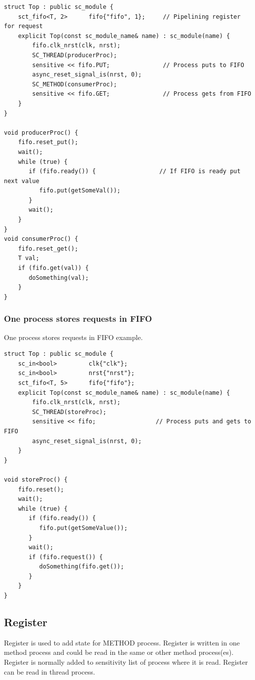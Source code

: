 \begin{lstlisting}[style=mycpp]
struct Top : public sc_module {
    sct_fifo<T, 2>      fifo{"fifo", 1};     // Pipelining register for request
    explicit Top(const sc_module_name& name) : sc_module(name) {
        fifo.clk_nrst(clk, nrst);
        SC_THREAD(producerProc); 
        sensitive << fifo.PUT;               // Process puts to FIFO
        async_reset_signal_is(nrst, 0);
        SC_METHOD(consumerProc); 
        sensitive << fifo.GET;               // Process gets from FIFO   
    } 
}

void producerProc() {
    fifo.reset_put();
    wait();
    while (true) {
       if (fifo.ready()) {                  // If FIFO is ready put next value
          fifo.put(getSomeVal());
       }
       wait();
    }
}
void consumerProc() {
    fifo.reset_get();
    T val;
    if (fifo.get(val)) {
       doSomething(val);
    }
}
\end{lstlisting}

\subsubsection{One process stores requests in FIFO}

One process stores requests in FIFO example.
\begin{lstlisting}[style=mycpp]
struct Top : public sc_module {
    sc_in<bool>         clk{"clk"};
    sc_in<bool>         nrst{"nrst"};
    sct_fifo<T, 5>      fifo{"fifo"};
    explicit Top(const sc_module_name& name) : sc_module(name) {
        fifo.clk_nrst(clk, nrst);
        SC_THREAD(storeProc); 
        sensitive << fifo;                 // Process puts and gets to FIFO
        async_reset_signal_is(nrst, 0);
    }
}

void storeProc() {
    fifo.reset();
    wait();
    while (true) {
       if (fifo.ready()) {
          fifo.put(getSomeValue());
       }
       wait(); 
       if (fifo.request()) {
          doSomething(fifo.get());
       }
    }
}
\end{lstlisting}


\subsection{Register}

Register is used to add state for METHOD process. Register is written in one method process and could be read in the same or other method process(es). Register is normally added to sensitivity list of process where it is read. Register can be read in thread process.

